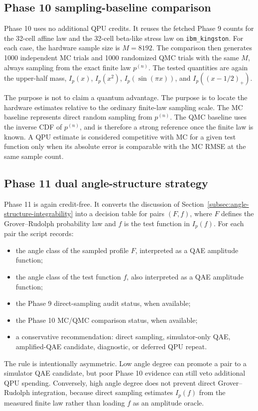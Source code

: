 \subsection{Phase 10 sampling-baseline comparison}

Phase 10 uses no additional QPU credits. It reuses the fetched Phase 9 counts
for the 32-cell affine law and the 32-cell beta-like stress law on
\texttt{ibm\_kingston}. For each case, the hardware sample size is \(M=8192\).
The comparison then generates 1000 independent MC trials and 1000 randomized
QMC trials with the same \(M\), always sampling from the exact finite law
\(p^{(n)}\). The tested quantities are again the upper-half mass, \(I_p(x)\),
\(I_p(x^2)\), \(I_p(\sin(\pi x))\), and \(I_p((x-1/2)_+)\).

The purpose is not to claim a quantum advantage. The purpose is to locate the
hardware estimates relative to the ordinary finite-law sampling scale. The MC
baseline represents direct random sampling from \(p^{(n)}\). The QMC baseline
uses the inverse CDF of \(p^{(n)}\), and is therefore a strong reference once
the finite law is known. A QPU estimate is considered competitive with MC for a
given test function only when its absolute error is comparable with the MC
RMSE at the same sample count.

\subsection{Phase 11 dual angle-structure strategy}

Phase 11 is again credit-free. It converts the discussion of
Section~\ref{subsec:angle-structure-integrability} into a decision table for
pairs \((F,f)\), where \(F\) defines the Grover--Rudolph probability law and
\(f\) is the test function in \(I_p(f)\). For each pair the script records:
\begin{itemize}[leftmargin=*]
  \item the angle class of the sampled profile \(F\), interpreted as a QAE
        amplitude function;
  \item the angle class of the test function \(f\), also interpreted as a QAE
        amplitude function;
  \item the Phase 9 direct-sampling audit status, when available;
  \item the Phase 10 MC/QMC comparison status, when available;
  \item a conservative recommendation: direct sampling, simulator-only QAE,
        amplified-QAE candidate, diagnostic, or deferred QPU repeat.
\end{itemize}
The rule is intentionally asymmetric. Low angle degree can promote a pair to a
simulator QAE candidate, but poor Phase 10 evidence can still veto additional
QPU spending. Conversely, high angle degree does not prevent direct
Grover--Rudolph integration, because direct sampling estimates \(I_p(f)\) from
the measured finite law rather than loading \(f\) as an amplitude oracle.

